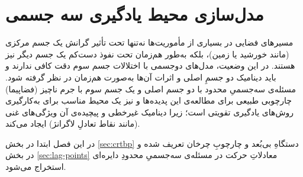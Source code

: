 \chapter{مدل‌سازی محیط یادگیری سه‌ جسمی}\label{ch:model}

مسیرهای فضایی در بسیاری از مأموریت‌ها نه‌تنها تحت تأثیر گرانش یک جسم مرکزی (مانند خورشید یا زمین)، بلکه به‌طور هم‌زمان تحت نفوذ دست‌کم یک جسم دیگر نیز هستند. در این وضعیت، مدل‌های دو‌جسمی با اختلالات جسم سوم دقت کافی ندارند و باید دینامیک دو جسمِ اصلی و اثرات آن‌ها به‌صورت هم‌زمان در نظر گرفته شود. مسئله‌ی سه‌جسمیِ محدود با دو جسم اصلی و یک جسم سوم با جرم ناچیز (فضاپیما) چارچوبی طبیعی برای مطالعه‌ی این پدیده‌ها و نیز یک محیط مناسب برای به‌کارگیری روش‌های یادگیری تقویتی است؛ زیرا دینامیک غیرخطی و پیچیده‌ی آن ویژگی‌های غنی (مانند نقاط تعادلِ لاگرانژ) ایجاد می‌کند.

در این فصل ابتدا در بخش  \ref{sec:crtbp} دستگاهِ بی‌بُعد و چارچوبِ چرخان تعریف شده و در بخش  \ref{sec:lag-points} معادلاتِ حرکت در مسئله‌ی سه‌جسمیِ محدودِ دایره‌ای استخراج می‌شود.




